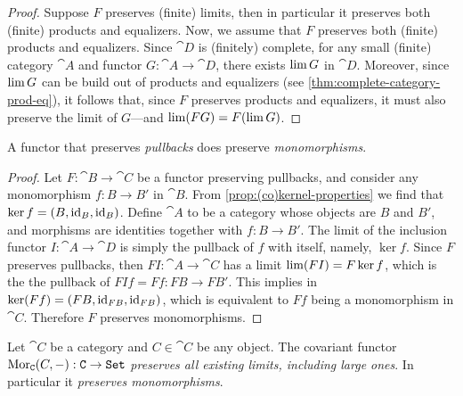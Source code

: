 \begin{proof}
    Suppose \(F\) preserves (finite) limits, then in particular it preserves both
    (finite) products and equalizers. Now, we assume that \(F\) preserves both
    (finite) products and equalizers. Since \(\cat D\) is (finitely) complete, for
    any small (finite) category \(\cat A\) and functor \(G: \cat A \to \cat D\),
    there exists \(\operatorname{lim} G\) in \(\cat D\). Moreover, since \(\operatorname{lim} G\) can be build
    out of products and equalizers (see \cref{thm:complete-category-prod-eq}), it
    follows that, since \(F\) preserves products and equalizers, it must also
    preserve the limit of \(G\)---and \(\operatorname{lim}(FG) = F(\operatorname{lim} G)\).
\end{proof}

\begin{proposition}
    \label{prop:preserve-pullback-then-mono}
    A functor that preserves \emph{pullbacks} does preserve \emph{monomorphisms}.
\end{proposition}

\begin{proof}
    Let \(F: \cat B \to \cat C\) be a functor preserving pullbacks, and consider any
    monomorphism \(f: B \to B'\) in \(\cat B\). From
    \cref{prop:(co)kernel-properties} we find that \(\ker f = (B, \operatorname{id}_B,
    \operatorname{id}_B)\). Define \(\cat A\) to be a category whose objects are \(B\) and \(B'\),
    and morphisms are identities together with \(f: B \to B'\). The limit of the
    inclusion functor \(I: \cat A \to \cat D\) is simply the pullback of \(f\) with
    itself, namely, \(\ker f\). Since \(F\) preserves pullbacks, then
    \(F I: \cat A \to \cat C\) has a limit \(\operatorname{lim} (F I) = F \ker f\), which is the
    the pullback of \(F I f = F f: F B \to F B'\). This implies in
    \(\ker(F f) = (F B, \operatorname{id}_{F B}, \operatorname{id}_{F B})\), which is equivalent to \(F f\)
    being a monomorphism in \(\cat C\). Therefore \(F\) preserves monomorphisms.
\end{proof}

\begin{proposition}
    \label{prop:Mor-func-preserves-all-limits}
    Let \(\cat C\) be a category and \(C \in \cat C\) be any object. The covariant
    functor \(\operatorname{Mor}_{\texttt C}(C, -): \texttt C \to {\texttt{Set}}\) \emph{preserves all existing
        limits, including large ones}. In particular it \emph{preserves
        monomorphisms}.
\end{proposition}

